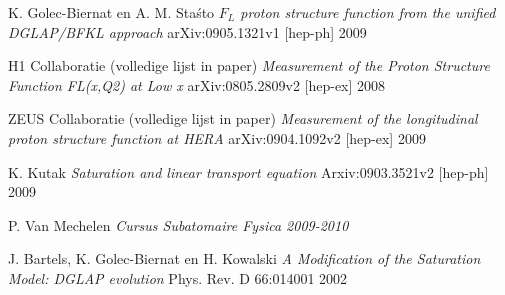 \documentclass[a4paper,11pt]{article}
\numberwithin{equation}{section} %
\begin{document}
\begin{thebibliography}{99}
  K. Golec-Biernat en A. M. Staśto
  \emph{$F_L$ proton structure function from the unified DGLAP/BFKL approach}
  arXiv:0905.1321v1 [hep-ph]
  2009

  H1 Collaboratie (volledige lijst in paper)
  \emph{Measurement of the Proton Structure Function FL(x,Q2) at Low x}
  arXiv:0805.2809v2 [hep-ex]
  2008

  ZEUS Collaboratie (volledige lijst in paper)
  \emph{Measurement of the longitudinal proton structure function at HERA}
  arXiv:0904.1092v2 [hep-ex]
  2009

  K. Kutak
  \emph{Saturation and linear transport equation}
  Arxiv:0903.3521v2 [hep-ph]
  2009

  P. Van Mechelen
  \emph{Cursus Subatomaire Fysica 2009-2010}

  J. Bartels, K. Golec-Biernat en H. Kowalski
  \emph{A Modification of the Saturation Model: DGLAP evolution}
  Phys. Rev. D 66:014001
  2002

\end{thebibliography}
\end{document}
